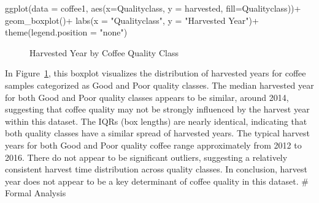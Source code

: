 \documentclass[
  letterpaper,
  DIV=11,
  numbers=noendperiod]{scrartcl}
\newenvironment{Shaded}{\begin{snugshade}}{\end{snugshade}}
\newcommand{\AttributeTok}[1]{\textcolor[rgb]{0.40,0.45,0.13}{#1}}
\newcommand{\FunctionTok}[1]{\textcolor[rgb]{0.28,0.35,0.67}{#1}}
\newcommand{\NormalTok}[1]{\textcolor[rgb]{0.00,0.23,0.31}{#1}}
\newcommand{\SpecialCharTok}[1]{\textcolor[rgb]{0.37,0.37,0.37}{#1}}
\newcommand{\StringTok}[1]{\textcolor[rgb]{0.13,0.47,0.30}{#1}}
\begin{document}
\begin{Shaded}
\begin{Highlighting}[]
\FunctionTok{ggplot}\NormalTok{(}\AttributeTok{data =}\NormalTok{ coffee1, }\FunctionTok{aes}\NormalTok{(}\AttributeTok{x=}\NormalTok{Qualityclass, }
                           \AttributeTok{y =}\NormalTok{ harvested, }
                           \AttributeTok{fill=}\NormalTok{Qualityclass))}\SpecialCharTok{+}
  \FunctionTok{geom\_boxplot}\NormalTok{()}\SpecialCharTok{+}
  \FunctionTok{labs}\NormalTok{(}\AttributeTok{x =} \StringTok{"Qualityclass"}\NormalTok{, }\AttributeTok{y =} \StringTok{"Harvested Year"}\NormalTok{)}\SpecialCharTok{+}
  \FunctionTok{theme}\NormalTok{(}\AttributeTok{legend.position =} \StringTok{"none"}\NormalTok{)}
\end{Highlighting}
\end{Shaded}

\begin{figure}[H]


\caption{\label{fig-boxplot6}Harvested Year by Coffee Quality Class}

\end{figure}%

In Figure~\ref{fig-boxplot6}, this boxplot visualizes the distribution
of harvested years for coffee samples categorized as Good and Poor
quality classes. The median harvested year for both Good and Poor
quality classes appears to be similar, around 2014, suggesting that
coffee quality may not be strongly influenced by the harvest year within
this dataset. The IQRs (box lengths) are nearly identical, indicating
that both quality classes have a similar spread of harvested years. The
typical harvest years for both Good and Poor quality coffee range
approximately from 2012 to 2016. There do not appear to be significant
outliers, suggesting a relatively consistent harvest time distribution
across quality classes. In conclusion, harvest year does not appear to
be a key determinant of coffee quality in this dataset. \# Formal
Analysis
\end{document}
